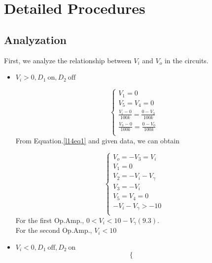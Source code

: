 \section{Detailed Procedures}
    \subsection{Analyzation}
    First, we analyze the relationship between $V_i$ and $V_o$ in the circuits.\par
    \begin{itemize}
        \item $V_i > 0, D_1~\text{on}, D_2~\text{off}$\par
            \begin{equation}
                \begin{cases}
                    V_1=0\\
                    V_5=V_4=0\\
                    \frac{V_i-0}{100k} = \frac{0-V_3}{100k}\\
                    \frac{V_3-0}{100k} = \frac{0-V_0}{100k}\\
                \end{cases}
                \label{l14eq1}
            \end{equation}
            From Equation.\ref{l14eq1} and given data, we can obtain\par
            \begin{equation*}
                \begin{cases}
                    V_o=-V_3=V_i\\
                    V_1=0\\
                    V_2=-V_i-V_\gamma\\
                    V_3=-V_i\\
                    V_5=V_4=0\\
                    -V_i-V_\gamma > -10\\
                \end{cases}
            \end{equation*}
            For the first Op.Amp., $0<V_i<10-V_\gamma(9.3)$.\\
            For the second Op.Amp., $V_i<10$\\
        \item $V_i < 0, D_1~\text{off}, D_2~\text{on}$
            \begin{equation}
                \begin{cases}

\end{cases}
\end{equation}
\end{itemize}

